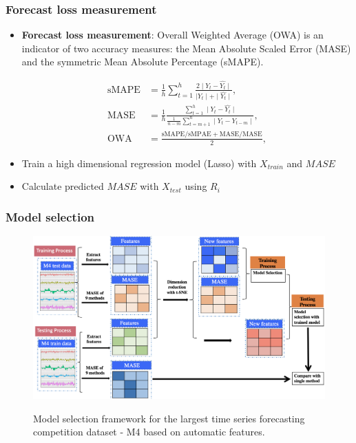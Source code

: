 \documentclass[10pt,aspectratio=43]{beamer}
\begin{document}
\begin{frame}
  \frametitle{Forecast loss measurement}
  \begin{itemize}
  \item \textbf{Forecast loss measurement}: Overall Weighted Average (OWA) is an indicator
    of two accuracy measures: the Mean Absolute Scaled Error (MASE) and the symmetric Mean
    Absolute Percentage (sMAPE).

\begin{equation*}
  \begin{aligned}
    \mathrm{sMAPE}&=\frac{1}{h}\sum_{t=1}^h\frac{2\mid Y_{t}-\widehat{Y_{t}}\mid}{\mid Y_{t}\mid+\mid\widehat{Y_{t}} \mid},\\
    \mathrm{MASE}&=\frac{1}{h}\frac{\sum_{t=1}^h\mid Y_{t}-\widehat{Y_{t}} \mid}{\frac{1}{n-m}\sum_{t=m+1}^n\mid Y_{t}-Y_{t-m} \mid},\\
    \mathrm{OWA}&=\frac{\mathrm{sMAPE /sMPAE + MASE/MASE}}{2},
  \end{aligned}
\end{equation*}



\item Train a high dimensional regression model (Lasso) with $X_{train}$ and $M ASE$
\item Calculate predicted $MASE$ with $X_{test}$ using $R_i$
\end{itemize}

\end{frame}

\begin{frame}
  \frametitle{Model selection}

\begin{figure}[htb]
  \centering
  \includegraphics[width=0.6\linewidth]{figures/model_selection_new.png}\\
  \caption{Model selection framework for the largest time series forecasting competition
    dataset - M4 \citep{M42018} based on automatic features.}
  \label{fig:framework}
\end{figure}

\end{frame}
\end{document}
